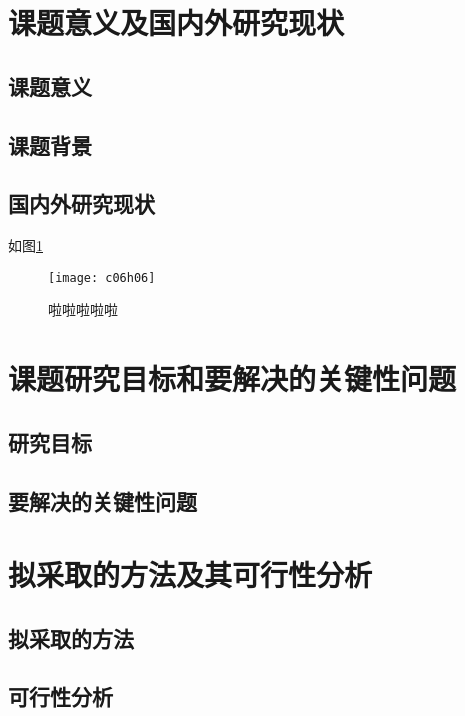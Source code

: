 
\section{课题意义及国内外研究现状}
\subsection{课题意义}

\subsection{课题背景}

\subsection{国内外研究现状}
如图\ref{fig:c06h06}


\begin{figure}[!htbp]
    \centering
    \texttt{[image: c06h06]}
    \caption{啦啦啦啦啦}
    \label{fig:c06h06}
\end{figure}
\section{课题研究目标和要解决的关键性问题}
\subsection{研究目标}


\subsection{要解决的关键性问题}

\section{拟采取的方法及其可行性分析}

\subsection{拟采取的方法}

\subsection{可行性分析}

